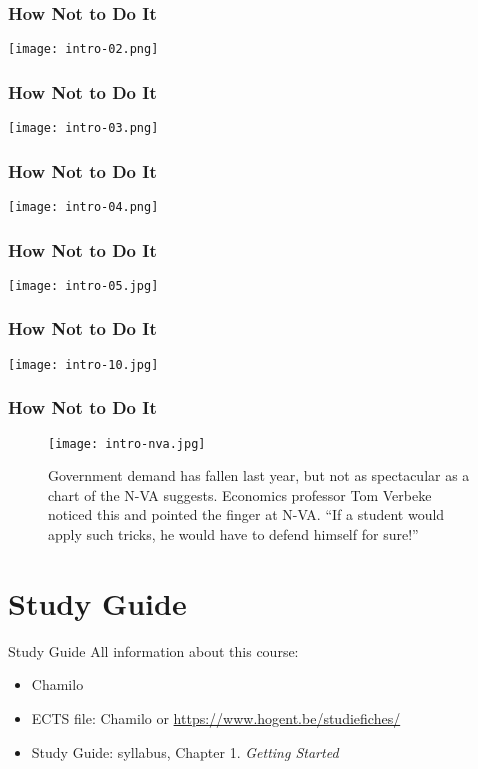 \documentclass[aspectratio=169]{beamer}
\begin{document}
\begin{frame}
  \frametitle{How Not to Do It}
  
  \centering
  \texttt{[image: intro-02.png]}
\end{frame}

\begin{frame}
  \frametitle{How Not to Do It}
  
  \centering
  \texttt{[image: intro-03.png]}
\end{frame}

\begin{frame}
  \frametitle{How Not to Do It}
  
  \centering
  \texttt{[image: intro-04.png]}
\end{frame}

\begin{frame}
  \frametitle{How Not to Do It}
  
  \centering
  \texttt{[image: intro-05.jpg]}
\end{frame}

\begin{frame}
  \frametitle{How Not to Do It}
  
  \centering
  \texttt{[image: intro-10.jpg]}
\end{frame}

\begin{frame}
  \frametitle{How Not to Do It}
  
  \begin{figure}
    \texttt{[image: intro-nva.jpg]}
    \caption{Government demand has fallen last year, but not as spectacular as a chart of the N-VA suggests.
        Economics professor Tom Verbeke noticed this and pointed the finger at N-VA.
        ``If a student would apply such tricks, he would have to defend himself for sure!''}
  \end{figure}
  
\end{frame}

\section{Study Guide}

\begin{frame}{Study Guide}
  All information about this course:
  
  \begin{itemize}
    \item Chamilo
    \item ECTS file: Chamilo or \url{https://www.hogent.be/studiefiches/}
    \item Study Guide: syllabus, Chapter 1. \textit{Getting Started}
  \end{itemize}
\end{frame}
\end{document}
